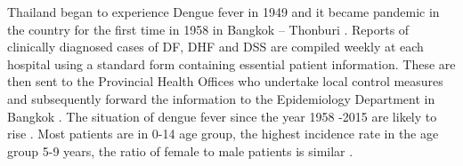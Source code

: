 \documentclass[review]{elsarticle}
\begin{document}

%


Thailand began to experience Dengue fever in 1949 and it became pandemic in the country for the first time in 1958 in Bangkok – Thonburi \cite{hammon1964virological}. Reports of clinically diagnosed cases of DF, DHF and DSS are compiled weekly at each hospital using a standard form containing essential patient information. These are then sent to the Provincial Health Offices who undertake local control measures and subsequently forward the information to the Epidemiology Department in Bangkok \cite{chareonsook1999changing}. The situation of dengue fever since the year 1958 -2015 are likely to rise \cite{wilder2012denguetools}. Most patients are in 0-14 age group, the highest incidence rate in the age group 5-9 years, the ratio of female to male patients is similar \cite{cummings2009impact,wilder2012denguetools}. 
\end{document}
